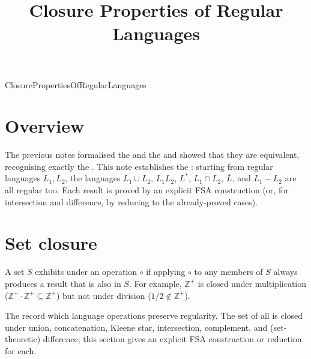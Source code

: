 \documentclass[hidelinks]{article}
\title{Closure Properties of Regular Languages}
\author{}
\date{}
\begin{document}
\maketitle

\begin{smodule}[title={Closure Properties of Regular Languages}]{ClosurePropertiesOfRegularLanguages}


\section{Overview}

The previous notes formalised the  and the  and showed that they are equivalent, recognising exactly the . This note establishes the : starting from regular languages $L_1, L_2$, the languages $L_1 \cup L_2$, $L_1 L_2$, $L^*$, $L_1 \cap L_2$, $\overline{L}$, and $L_1 - L_2$ are all regular too. Each result is proved by an explicit FSA construction (or, for intersection and difference, by reducing to the already-proved cases).

\section{Set closure}

\begin{sdefinition}[for=set closure]
A set $S$ exhibits  under an operation $\circ$ if applying $\circ$ to any members of $S$ always produces a result that is also in $S$. For example, $\mathbb{Z}^+$ is closed under multiplication ($\mathbb{Z}^+ \cdot \mathbb{Z}^+ \subseteq \mathbb{Z}^+$) but not under division ($1/2 \notin \mathbb{Z}^+$).
\end{sdefinition}

\begin{sdefinition}[for=closure properties for regular languages]
The  record which language operations preserve regularity. The set of all  is closed under union, concatenation, Kleene star, intersection, complement, and (set-theoretic) difference; this section gives an explicit FSA construction or reduction for each.
\end{sdefinition}


\end{smodule}
\end{document}
